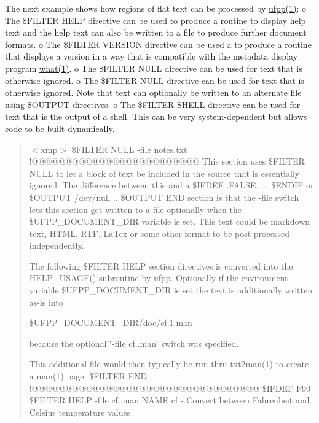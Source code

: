 The next example shows how regions of flat text can be processed by \hyperlink{ufpp__overview_81_8txt_a97c20a96bcab81bc74c9d64b001f1202}{ufpp(1)}\+: o The \$\+F\+I\+L\+T\+ER H\+E\+LP directive can be used to produce a routine to display help text and the help text can also be written to a file to produce further document formats. o The \$\+F\+I\+L\+T\+ER V\+E\+R\+S\+I\+ON directive can be used a to produce a routine that displays a version in a way that is compatible with the metadata display program \hyperlink{what__overview_81_8txt_a8cdf8efd1b900d6dce77a3f97edb2216}{what(1)}. o The \$\+F\+I\+L\+T\+ER N\+U\+LL directive can be used for text that is otherwise ignored. o The \$\+F\+I\+L\+T\+ER N\+U\+LL directive can be used for text that is otherwise ignored. Note that text can optionally be written to an alternate file using \$\+O\+U\+T\+P\+UT directives. o The \$\+F\+I\+L\+T\+ER S\+H\+E\+LL directive can be used for text that is the output of a shell. This can be very system-\/dependent but allows code to be built dynamically. \begin{quote}
$<$xmp$>$ \$\+F\+I\+L\+T\+ER N\+U\+LL -\/file notes.\+txt !@@@@@@@@@@@@@@@@@@@@@@@@@ This section uses \$\+F\+I\+L\+T\+ER N\+U\+LL to let a block of text be included in the source that is essentially ignored. The difference between this and a \$\+I\+F\+D\+EF .F\+A\+L\+SE. ... \$\+E\+N\+D\+IF or \$\+O\+U\+T\+P\+UT /dev/null .. \$\+O\+U\+T\+P\+UT E\+ND section is that the -\/file switch lets this section get written to a file optionally when the \$\+U\+F\+P\+P\+\_\+\+D\+O\+C\+U\+M\+E\+N\+T\+\_\+\+D\+IR variable is set. This text could be markdown text, H\+T\+ML, R\+TF, La\+Tex or some other format to be post-\/processed independently.

The following \$\+F\+I\+L\+T\+ER H\+E\+LP section directives is converted into the H\+E\+L\+P\+\_\+\+U\+S\+A\+G\+E() subroutine by ufpp. Optionally if the environment variable \$\+U\+F\+P\+P\+\_\+\+D\+O\+C\+U\+M\+E\+N\+T\+\_\+\+D\+IR is set the text is additionally written as-\/is into

\$\+U\+F\+P\+P\+\_\+\+D\+O\+C\+U\+M\+E\+N\+T\+\_\+\+D\+IR/doc/cf.1.\+man

because the optional \char`\"{}-\/file cf..\+man\char`\"{} switch was specified.

This additional file would then typically be run thru txt2man(1) to create a man(1) page. \$\+F\+I\+L\+T\+ER E\+ND !@@@@@@@@@@@@@@@@@@@@@@@@@@@@@@@@@@ \$\+I\+F\+D\+EF F90 \$\+F\+I\+L\+T\+ER H\+E\+LP -\/file cf..\+man N\+A\+ME cf -\/ Convert between Fahrenheit and Celsius temperature values


\end{quote}

